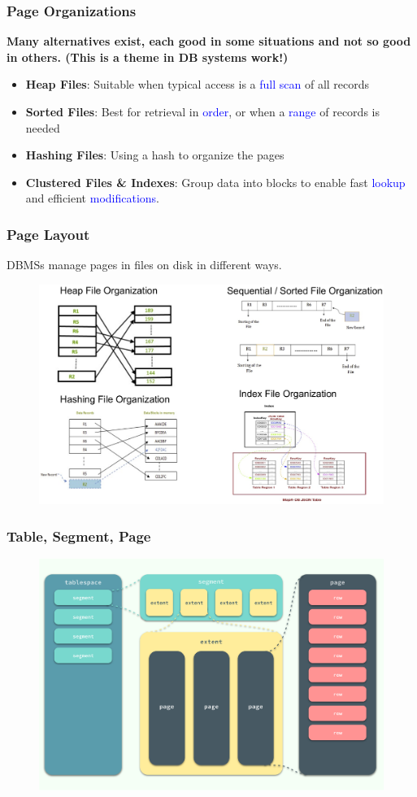\begin{frame}[fragile]
	\frametitle{Page Organizations}
	
	\textbf{Many alternatives exist, each good in some situations and not so good in others. 
		(This is a theme in DB systems work!)}
	
	\begin{itemize}
		\item \textbf{Heap Files}: Suitable when typical access is a \textcolor{blue}{full scan} of all records
		\item \textbf{Sorted Files}: Best for retrieval in \textcolor{blue}{order}, 
		or when a \textcolor{blue}{range} of records is needed
		\item \textbf{Hashing Files}: Using a hash to organize the pages
		\item \textbf{Clustered Files \& Indexes}: 
			Group data into blocks to enable fast \textcolor{blue}{lookup} and efficient 
			\textcolor{blue}{modifications}.
	\end{itemize}
\end{frame}

\begin{frame}[fragile]
	\frametitle{Page Layout}
	DBMSs manage pages in files on disk in different ways.
	\begin{figure}
		\includegraphics[width=.7\linewidth]{figs/dbfile-layouts.pdf}
	\end{figure}
\end{frame}


\begin{frame}[fragile]
	\frametitle{Table, Segment, Page}
	\begin{figure}
		\includegraphics[width=.68\linewidth]{figs/dbfile-table-seg-page1.png}
	\end{figure}
\end{frame}

